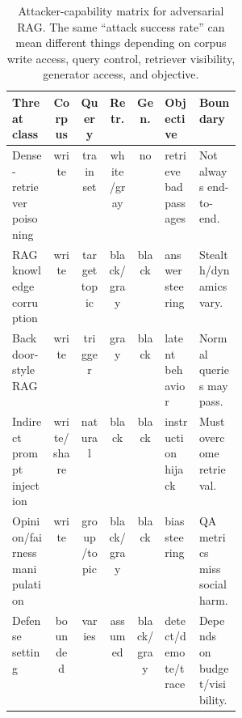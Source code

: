 \documentclass[11pt]{article}
\begin{document}
\begin{table}[t]
\centering
\scriptsize
\renewcommand{\arraystretch}{0.88}
\begin{tabularx}{\linewidth}{>{\raggedright\arraybackslash}p{0.18\linewidth}c c c c >{\raggedright\arraybackslash}p{0.15\linewidth}X}
\toprule
\textbf{Threat class} & \textbf{Corpus} & \textbf{Query} & \textbf{Retr.} & \textbf{Gen.} & \textbf{Objective} & \textbf{Boundary} \\
\midrule
Dense-retriever poisoning \citep{poisoningRetrievalCorpora2023} & write & train set & white/gray & no & retrieve bad passages & Not always end-to-end. \\
RAG knowledge corruption \citep{poisonedRAG2024,badRAG2024} & write & target topic & black/gray & black & answer steering & Stealth/dynamics vary. \\
Backdoor-style RAG \citep{trojanRAG2024,phantom2024} & write & trigger & gray & black & latent behavior & Normal queries may pass. \\
Indirect prompt injection \citep{aip2025,rrag005} & write/share & natural & black & black & instruction hijack & Must overcome retrieval. \\
Opinion/fairness manipulation \citep{rrag104,rrag162} & write & group/topic & black/gray & black & bias steering & QA metrics miss social harm. \\
Defense setting \citep{certifiedRAG2024,rrag004,rrag015,rrag128} & bounded & varies & assumed & black/gray & detect/demote/trace & Depends on budget/visibility. \\
\bottomrule
\end{tabularx}
\caption{Attacker-capability matrix for adversarial RAG. The same ``attack success rate'' can mean different things depending on corpus write access, query control, retriever visibility, generator access, and objective.}
\label{tab:attacker-capability}
\end{table}

\end{document}
